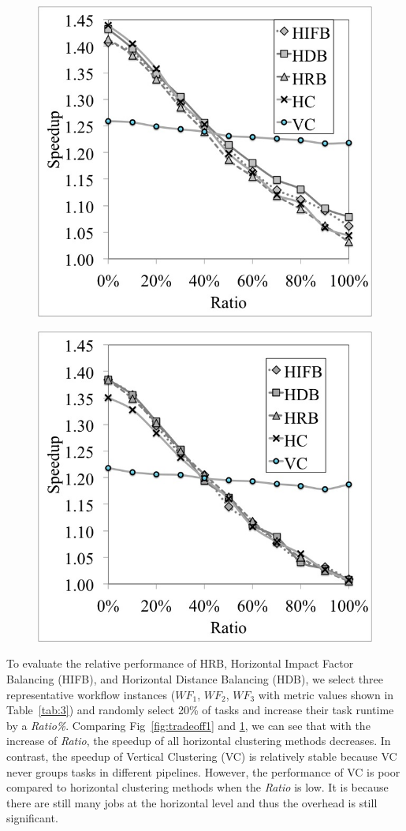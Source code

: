 \begin{figure}
\begin{minipage}{.5\textwidth}
  \includegraphics[width=1.0\linewidth]{figures/balance//figure3_3.jpg}
  \label{fig:tradeoff3}
\end{minipage}
\end{figure}

\begin{figure}
\centering
  \includegraphics[width=0.5\linewidth]{figures/balance//figure3_4.jpg}
  \label{fig:tradeoff4}
\end{figure}

To evaluate the relative performance of HRB, Horizontal Impact Factor Balancing (HIFB), and Horizontal Distance Balancing (HDB), we select three representative workflow instances ($WF_1$, $WF_2$, $WF_3$ with  metric values shown in Table~\ref{tab:3}) and randomly select 20\% of tasks and increase their task runtime by a {\em Ratio\%}. Comparing Fig~\ref{fig:tradeoff1} and \ref{fig:tradeoff3}, we can see that with the increase of {\em Ratio}, the speedup of all horizontal clustering methods decreases. In contrast, the speedup of Vertical Clustering (VC) is relatively stable because VC never groups tasks in different pipelines. However, the performance of VC is poor compared to horizontal clustering methods when the {\em Ratio} is low. It is because there are still many jobs at the horizontal level and thus the overhead is still significant. 



